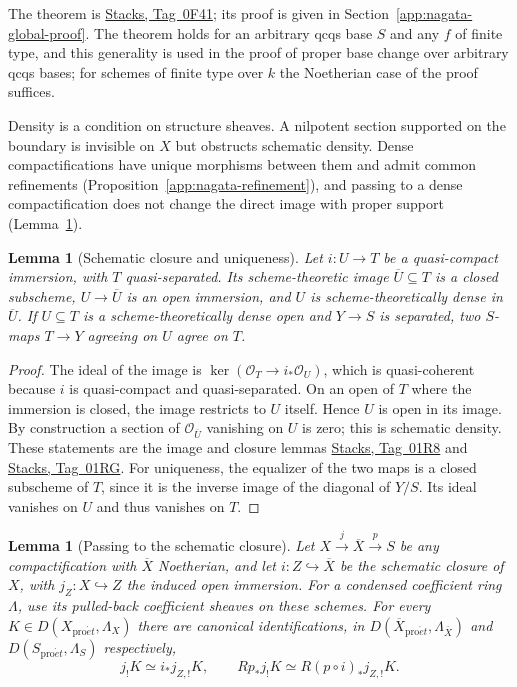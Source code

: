 \documentclass[11pt,a4paper]{article}
\numberwithin{equation}{section}
\newtheorem{lemma}[theorem]{Lemma}
\theoremstyle{definition}
\theoremstyle{remark}
\newcommand{\proet}{\mathrm{pro}\acute{e}t}
\newcommand{\stacks}[1]{\href{https://stacks.math.columbia.edu/tag/#1}{\textnormal{Stacks, Tag~#1}}}
\begin{document}
The theorem is \stacks{0F41}; its proof is given in
Section~\ref{app:nagata-global-proof}. The theorem holds for an
arbitrary qcqs base $S$ and any $f$ of finite type, and this generality
is used in the proof of proper base change over arbitrary qcqs bases;
for schemes of finite type over $k$ the Noetherian case of the proof
suffices.

Density is a condition on structure sheaves. A nilpotent section
supported on the boundary is invisible on $X$ but obstructs schematic
density. Dense compactifications have unique morphisms between them and
admit common refinements (Proposition~\ref{app:nagata-refinement}), and
passing to a dense compactification does not change the direct image
with proper support (Lemma~\ref{app:nagata-density-normalization}).

\begin{lemma}[Schematic closure and uniqueness]
\label{app:nagata-closure}
Let $i:U\to T$ be a quasi-compact immersion, with $T$ quasi-separated.
Its scheme-theoretic image $\overline U\subseteq T$ is a closed
subscheme, $U\to\overline U$ is an open immersion, and $U$ is
scheme-theoretically dense in $\overline U$.
If $U\subseteq T$ is a scheme-theoretically dense open and $Y\to S$
is separated, two $S$-maps $T\to Y$ agreeing on $U$ agree on $T$.
\end{lemma}

\begin{proof}
The ideal of the image is
$\ker(\mathcal O_T\to i_*\mathcal O_U)$, which is quasi-coherent
because $i$ is quasi-compact and quasi-separated. On an open of $T$
where the immersion is closed, the image restricts to $U$ itself.
Hence $U$ is open in its image. By construction a section of
$\mathcal O_{\overline U}$ vanishing on $U$ is zero; this is schematic
density. These statements are the image and closure lemmas
\stacks{01R8} and \stacks{01RG}.
For uniqueness, the equalizer of the two maps is a closed subscheme
of $T$, since it is the inverse image of the diagonal of $Y/S$.
Its ideal vanishes on $U$ and thus vanishes on $T$.
\end{proof}

\begin{lemma}[Passing to the schematic closure]
\label{app:nagata-density-normalization}
Let $X\xrightarrow{j}\overline X\xrightarrow{p}S$ be any
compactification with $\overline X$ Noetherian, and let
$i:Z\hookrightarrow\overline X$ be the
schematic closure of $X$, with $j_Z:X\hookrightarrow Z$ the induced
open immersion. For a condensed coefficient ring $\Lambda$, use its
pulled-back coefficient sheaves on these schemes. For every
$K\in D(X_{\proet},\Lambda_X)$ there are canonical identifications,
in $D(\overline X_{\proet},\Lambda_{\overline X})$ and
$D(S_{\proet},\Lambda_S)$ respectively,
\[
 j_!K\simeq i_*j_{Z,!}K,\qquad
 Rp_*j_!K\simeq R(p\circ i)_*j_{Z,!}K.
\]
\end{lemma}
\end{document}
